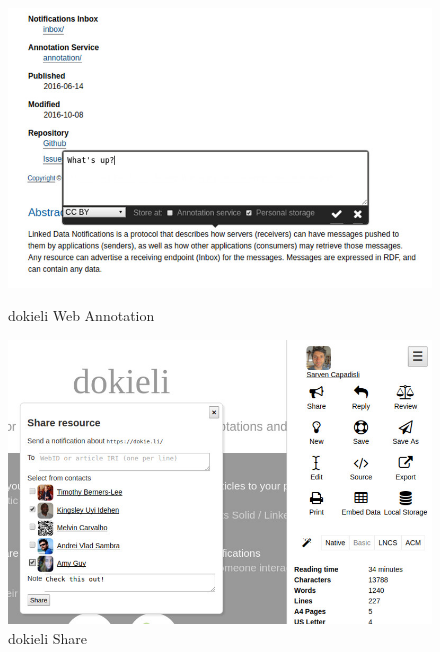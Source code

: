 \documentclass[a4paper]{llncs}
\begin{document}
\begin{figure}
  \begin{minipage}[b]{.49\textwidth}
    \includegraphics[width=\textwidth]{media/images/dokieli-annotation}
    \caption{dokieli Web Annotation}
    \label{fig:dokieli-annotation}
  \end{minipage}
  \hfill
  \begin{minipage}[b]{.49\textwidth}
    \includegraphics[width=\textwidth]{media/images/dokieli-share}
    \caption{dokieli Share}
    \label{fig:dokieli-share}
  \end{minipage}
\end{figure}
                                    
\end{document}
